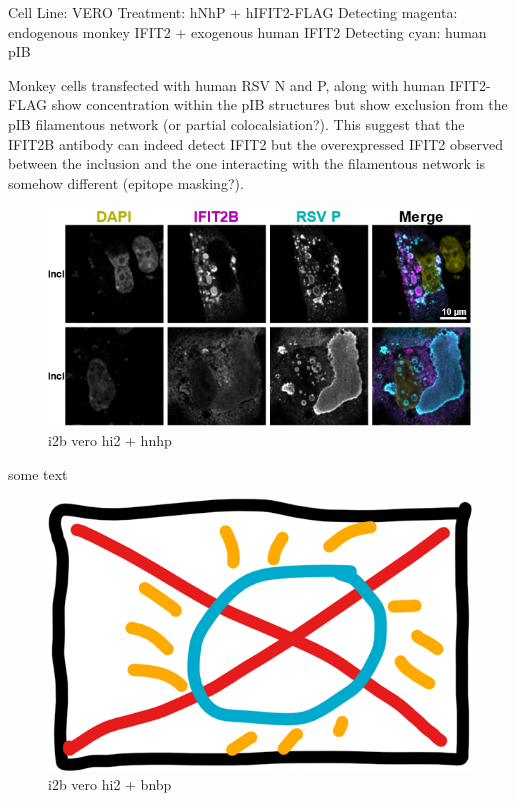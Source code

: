 Cell Line: VERO \newline
Treatment: hNhP + hIFIT2-FLAG \newline
Detecting magenta: endogenous monkey IFIT2 + exogenous human IFIT2 \newline
Detecting cyan: human pIB \newline

Monkey cells transfected with human RSV N and P, along with human IFIT2-FLAG show concentration within the pIB structures but show exclusion from the pIB filamentous network (or partial colocalsiation?). This suggest that the IFIT2B antibody can indeed detect IFIT2 but the overexpressed IFIT2 observed between the inclusion and the one interacting with the filamentous network is somehow different (epitope masking?).

\begin{figure}
    \centering
    \includegraphics[width=1\linewidth]{09. Chapter 4//Figs//02. I2B/02. i2b vero i2 hnhp.png}
    \caption[i2b vero hi2 + hnhp]{i2b vero hi2 + hnhp}
    \label{i2b vero hi2 + hnhp}
\end{figure}

some text

\begin{figure}
    \centering
    \includegraphics[width=0.5\linewidth]{09. Chapter 4//Figs//02. I2B/00. placeholder.png}
    \caption[i2b vero hi2 + bnbp]{i2b vero hi2 + bnbp}
    \label{i2b vero hi2 + bnbp}
\end{figure}

